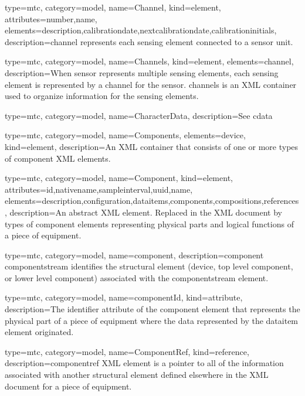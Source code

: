 {
  type=mtc,
  category=model,
  name={Channel},
  kind={element},
  attributes={\gls{number},\gls{name}},
  elements={\gls{description},\gls{calibrationdate},\gls{nextcalibrationdate},\gls{calibrationinitials}},
  description={\gls{channel} represents each \gls{sensing element} connected to a \gls{sensor unit}.}
}

{
  type=mtc,
  category=model,
  name={Channels},
  kind={element},
  elements={\gls{channel}},
  description={When \gls{sensor} represents multiple \glspl{sensing element}, each \gls{sensing element} is represented by a \gls{channel} for the \gls{sensor}. \gls{channels} is an XML container used to organize information for the \glspl{sensing element}. }
}


{
  type=mtc,
  category=model,
  name={CharacterData},
  description={See \gls{cdata}}
}


{
  type=mtc,
  category=model,
  name={Components},
  elements={\gls{device}},
  kind={element},
  description={An XML container that consists of one or more types of \gls{component} XML elements. } 
}


{
  type=mtc,
  category=model,
  name={Component},
  kind={element},
  attributes={\gls{id},\gls{nativename},\gls{sampleinterval},\gls{uuid},\gls{name}},
  elements={\gls{description},\gls{configuration},\gls{dataitems},\gls{components},\glspl{composition},\gls{references}},
  description={An abstract XML element. Replaced in the XML document by types of \gls{component} elements representing physical parts and logical functions of a piece of equipment.}
}


{
  type=mtc,
  category=model,
  name={component},
  description={\gls{component componentstream} identifies the \gls{structural element} (\gls{device}, \gls{top level} \gls{component}, or \gls{lower level} \gls{component}) associated with the \gls{componentstream} element.}
}


{
  type=mtc,
  category=model,
  name={componentId},
  kind={attribute},
  description={The identifier attribute of the \gls{component} element that represents the physical part of a piece of equipment where the data represented by the \gls{dataitem} element originated.}
}


{
  type=mtc,
  category=model,
  name={ComponentRef},
  kind={reference},
  description={\gls{componentref} XML element is a pointer to all of the information associated with another \gls{structural element} defined elsewhere in the XML document for a piece of equipment. } 
}



